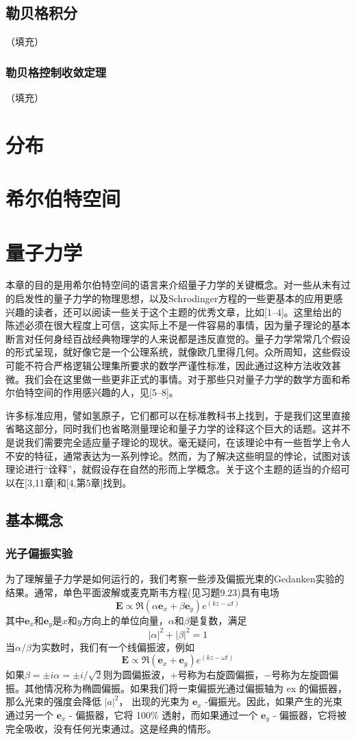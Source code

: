 \documentclass[hyperref,UTF8]{ctexbook}
\begin{document}
\section{勒贝格积分}（填充）
\subsection{勒贝格控制收敛定理}（填充）
\chapter{分布}

\chapter{希尔伯特空间}

\chapter{量子力学}
本章的目的是用希尔伯特空间的语言来介绍量子力学的关键概念。对一些从未有过的启发性的量子力学的物理思想，以及Schrodinger方程的一些更基本的应用更感兴趣的读者，还可以阅读一些关于这个主题的优秀文章，比如[1–4]。这里给出的陈述必须在很大程度上可信，这实际上不是一件容易的事情，因为量子理论的基本断言对任何身经百战经典物理学的人来说都是违反直觉的。量子力学常常几个假设的形式呈现，就好像它是一个公理系统，就像欧几里得几何。众所周知，这些假设可能不符合严格逻辑公理集所要求的数学严谨性标准，因此通过这种方法收效甚微。我们会在这里做一些更非正式的事情。对于那些只对量子力学的数学方面和希尔伯特空间的作用感兴趣的人，见[5–8]。

许多标准应用，譬如氢原子，它们都可以在标准教科书上找到，于是我们这里直接省略这部分，同时我们也省略测量理论和量子力学的诠释这个巨大的话题。这并不是说我们需要完全适应量子理论的现状。毫无疑问，在该理论中有一些哲学上令人不安的特征，通常表达为一系列悖论。然而，为了解决这些明显的悖论，试图对该理论进行“诠释”，就假设存在自然的形而上学概念。关于这个主题的适当的介绍可以在[3,11章]和[4,第5章]找到。
\section{基本概念}
\subsection{光子偏振实验}
为了理解量子力学是如何运行的，我们考察一些涉及偏振光束的Gedanken实验的结果。通常，单色平面波解或麦克斯韦方程(见习题9.23)具有电场
\[\mathbf{E}\propto \Re(\alpha \mathbf{e}_x+\beta\mathbf{e}_y)e^{(kz-\omega t)}\]
其中\(\mathbf{e}_x\)和\(\mathbf{e}_y\)是\(x\)和\(y\)方向上的单位向量，\(\alpha \)和\(\beta\)是复数，满足
\[|\alpha|^2+|\beta|^2=1\]
当\(\alpha/\beta\)为实数时，我们有一个线偏振波，例如
\[\mathbf{E}\propto \Re(\mathbf{e}_x+\mathbf{e}_y)e^{(kz-\omega t)}\]
如果\(\beta =\pm i\alpha = \pm i/\sqrt{2}\)则为圆偏振波，\(+\)号称为右旋圆偏振，\(-\)号称为左旋圆偏振。其他情况称为椭圆偏振。如果我们将一束偏振光通过偏振轴为 ex 的偏振器，那么光束的强度会降低 $|a|^{2}$， 出现的光束为 $\mathbf{e}_{x}$ -偏振光。因此，如果产生的光束通过另一个 $\mathbf{e}_{x}$ - 偏振器，它将 100\% 透射，而如果通过一个 $\mathbf{e}_{y}$ - 偏振器，它将被完全吸收，没有任何光束通过。这是经典的情形。
\end{document}
